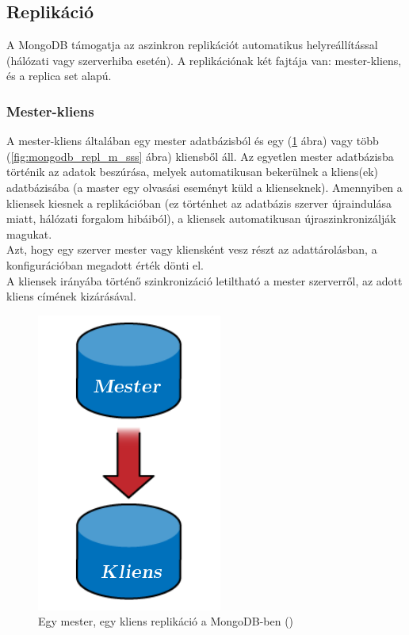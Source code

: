 	\subsection{Replikáció}
		A MongoDB támogatja az aszinkron replikációt automatikus helyreállítással (hálózati vagy szerverhiba esetén). A replikációnak két fajtája van: mester-kliens, és a replica set alapú.
		
		\subsubsection{Mester-kliens}
			A mester-kliens általában egy mester adatbázisból és egy (\ref{fig:mongodb_repl_m_s} ábra) vagy több (\ref{fig:mongodb_repl_m_sss} ábra) kliensből áll. Az egyetlen mester adatbázisba történik az adatok beszúrása, melyek automatikusan bekerülnek a kliens(ek) adatbázisába (a master egy olvasási eseményt küld a klienseknek). Amennyiben a kliensek kiesnek a replikációban (ez történhet az adatbázis szerver újraindulása miatt, hálózati forgalom hibáiból), a kliensek automatikusan újraszinkronizálják magukat.\\
			Azt, hogy egy szerver mester vagy kliensként vesz részt az adattárolásban, a konfigurációban megadott érték dönti el. \\
			A kliensek irányába történő szinkronizáció letiltható a mester szerverről, az adott kliens címének kizárásával.\\
			
			\begin{figure}[ht]
				\centering
					\includegraphics[scale=0.5]{pictures/mongo_repl_m_s.png}%
					\caption[DUMMY]%
					{Egy mester, egy kliens replikáció a MongoDB-ben (\cite{scaling_mongodb_repl_m_s})}
					\label{fig:mongodb_repl_m_s}
			\end{figure}
			
